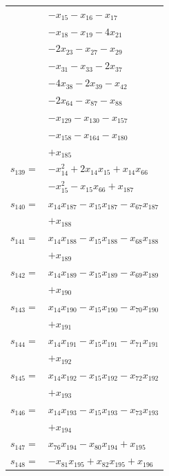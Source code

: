 \begin{longtable}{@{}r@{\;}l@{}}
 & \(\displaystyle -x_{15} -x_{16} -x_{17}\) \\
 & \(\displaystyle -x_{18} -x_{19} -4x_{21}\) \\
 & \(\displaystyle -2x_{23} -x_{27} -x_{29}\) \\
 & \(\displaystyle -x_{31} -x_{33} -2x_{37}\) \\
 & \(\displaystyle -4x_{38} -2x_{39} -x_{42}\) \\
 & \(\displaystyle -2x_{64} -x_{87} -x_{88}\) \\
 & \(\displaystyle -x_{129} -x_{130} -x_{157}\) \\
 & \(\displaystyle -x_{158} -x_{164} -x_{180}\) \\
 & \(\displaystyle +x_{185}\) \\[3pt]
\(s_{139}=\) & \(\displaystyle -x_{14}^{2} +2x_{14}x_{15} +x_{14}x_{66}\) \\
 & \(\displaystyle -x_{15}^{2} -x_{15}x_{66} +x_{187}\) \\[3pt]
\(s_{140}=\) & \(\displaystyle x_{14}x_{187} -x_{15}x_{187} -x_{67}x_{187}\) \\
 & \(\displaystyle +x_{188}\) \\[3pt]
\(s_{141}=\) & \(\displaystyle x_{14}x_{188} -x_{15}x_{188} -x_{68}x_{188}\) \\
 & \(\displaystyle +x_{189}\) \\[3pt]
\(s_{142}=\) & \(\displaystyle x_{14}x_{189} -x_{15}x_{189} -x_{69}x_{189}\) \\
 & \(\displaystyle +x_{190}\) \\[3pt]
\(s_{143}=\) & \(\displaystyle x_{14}x_{190} -x_{15}x_{190} -x_{70}x_{190}\) \\
 & \(\displaystyle +x_{191}\) \\[3pt]
\(s_{144}=\) & \(\displaystyle x_{14}x_{191} -x_{15}x_{191} -x_{71}x_{191}\) \\
 & \(\displaystyle +x_{192}\) \\[3pt]
\(s_{145}=\) & \(\displaystyle x_{14}x_{192} -x_{15}x_{192} -x_{72}x_{192}\) \\
 & \(\displaystyle +x_{193}\) \\[3pt]
\(s_{146}=\) & \(\displaystyle x_{14}x_{193} -x_{15}x_{193} -x_{73}x_{193}\) \\
 & \(\displaystyle +x_{194}\) \\[3pt]
\(s_{147}=\) & \(\displaystyle x_{76}x_{194} -x_{80}x_{194} +x_{195}\) \\[3pt]
\(s_{148}=\) & \(\displaystyle -x_{81}x_{195} +x_{82}x_{195} +x_{196}\) \\[3pt]

\end{longtable}
